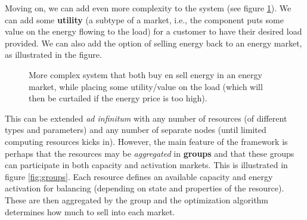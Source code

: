\documentclass[]{report}
\renewcommand{\emph}{\textbf}
\begin{document}
Moving on, we can add even more complexity to the system (see figure \ref{fig:sys3}). We can add some \emph{utility} (a subtype of a market, i.e., the component puts some value on the energy flowing to the load) for a customer to have their desired load provided. We can also add the option of selling energy back to an energy market, as illustrated in the figure.

\begin{figure}
    \centering
    \caption{More complex system that both buy en sell energy in an energy market, while placing some utility/value on the load (which will then be curtailed if the energy price is too high).}
    \label{fig:sys3}
\end{figure}


This can be extended \textit{ad infinitum} with any number of resources (of different types and parameters) and any number of separate nodes (until limited computing resources kicks in). However, the main feature of the framework is perhaps that the resources may be \textit{aggregated} in \emph{groups} and that these groups can participate in both capacity and activation markets. This is illustrated in figure \ref{fig:groups}. Each resource defines an available capacity and energy activation for balancing (depending on state and properties of the resource). These are then aggregated by the group and the optimization algorithm determines how much to sell into each market.
\end{document}
